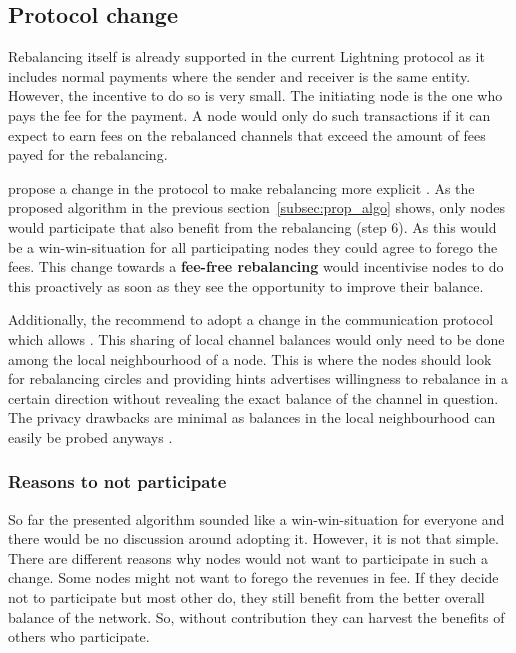 \documentclass[final]{fhnwreport}       %
\begin{document}
\subsection{Protocol change}
Rebalancing itself is already supported in the current Lightning protocol as it includes normal payments where the sender and receiver is the same entity. However, the incentive to do so is very small. The initiating node is the one who pays the fee for the payment. A node would only do such transactions if it can expect to earn fees on the rebalanced channels that exceed the amount of fees payed for the rebalancing. 

\citeauthor{pickhardt_imbalance_2019} propose a change in the protocol to make rebalancing more explicit \citep{pickhardt_imbalance_2019}. As the proposed algorithm in the previous section~\ref{subsec:prop_algo} shows, only nodes would participate that also benefit from the rebalancing (step 6). As this would be a win-win-situation for all participating nodes they could agree to forego the fees. This change towards a \textbf{fee-free rebalancing} would incentivise nodes to do this proactively as soon as they see the opportunity to improve their balance.

Additionally, the recommend to adopt a change in the communication protocol which allows . This sharing of local channel balances would only need to be done among the local neighbourhood of a node. This is where the nodes should look for rebalancing circles and providing hints advertises willingness to rebalance in a certain direction without revealing the exact balance of the channel in question. The privacy drawbacks are minimal as balances in the local neighbourhood can easily be probed anyways \citep{tikhomirov_probing_2020}. 
 
\subsubsection{Reasons to not participate}
So far the presented algorithm sounded like a win-win-situation for everyone and there would be no discussion around adopting it. However, it is not that simple. There are different reasons why nodes would not want to participate in such a change. Some nodes might not want to forego the revenues in fee. If they decide not to participate but most other do, they still benefit from the better overall balance of the network. So, without contribution they can harvest the benefits of others who participate. 
\end{document}
